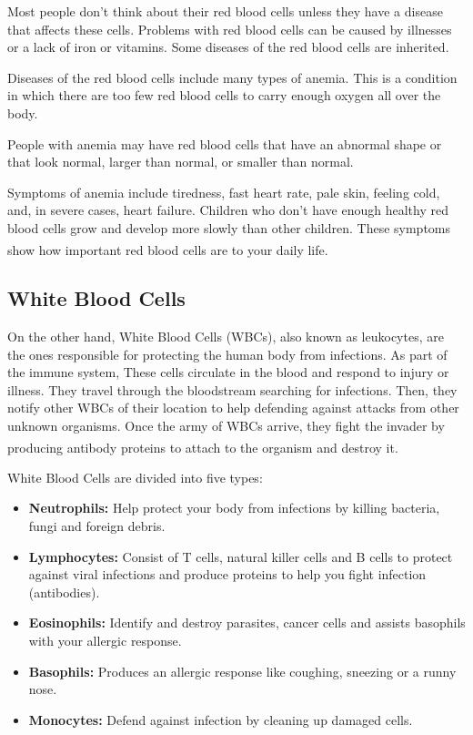 Most people don't think about their red blood cells unless they have a disease that affects these cells. Problems with red blood cells can be caused by illnesses or a lack of iron or vitamins. Some diseases of the red blood cells are inherited.

Diseases of the red blood cells include many types of anemia. This is a condition in which there are too few red blood cells to carry enough oxygen all over the body.

\newpage

People with anemia may have red blood cells that have an abnormal shape or that look normal, larger than normal, or smaller than normal.

Symptoms of anemia include tiredness, fast heart rate, pale skin, feeling cold, and, in severe cases, heart failure. Children who don't have enough healthy red blood cells grow and develop more slowly than other children. These symptoms show how important red blood cells are to your daily life. \textsuperscript{\cite{Department_2022_rochester}}

\subsection{White Blood Cells}

On the other hand, White Blood Cells (WBCs), also known as leukocytes, are the ones responsible for protecting the human body from infections. As part of the immune system, These cells circulate in the blood and respond to injury or illness. They travel through the bloodstream searching for infections. Then, they notify other WBCs of their location to help defending against attacks from other unknown organisms. Once the army of WBCs arrive, they fight the invader by producing antibody proteins to attach to the organism and destroy it. \textsuperscript{\cite{Attacking_Any_Unknown_2022_clevelandclinic}}

White Blood Cells are divided into five types:

\begin{itemize}
  \item \textbf{Neutrophils:} Help protect your body from infections by killing bacteria, fungi and foreign debris.
  \item \textbf{Lymphocytes:} Consist of T cells, natural killer cells and B cells to protect against viral infections and produce proteins to help you fight infection (antibodies).
  \item \textbf{Eosinophils:} Identify and destroy parasites, cancer cells and assists basophils with your allergic response.
  \item \textbf{Basophils:} Produces an allergic response like coughing, sneezing or a runny nose.
  \item \textbf{Monocytes:} Defend against infection by cleaning up damaged cells.
\end{itemize}

